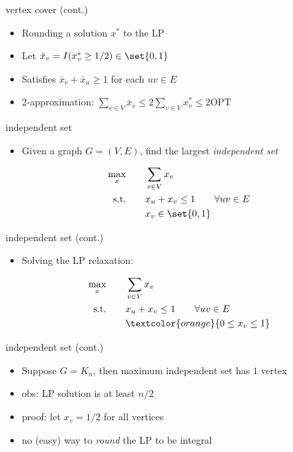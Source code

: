 \documentclass[aspectratio=169, handout]{beamer}
\begin{document}
\begin{frame}{vertex cover (cont.)}
    \begin{itemize}[<+->]
        \item Rounding a solution $x^*$ to the LP
        \item Let $\bar{x}_v = I(x^*_v \ge 1/2) \in \set{0, 1}$
        \item Satisfies $\bar{x}_v + \bar{x}_u \ge 1$ for each $uv \in E$
        \item 2-approximation: $\sum_{v \in V} \bar{x}_v \le 2 \sum_{v \in V} x^*_v \le 2 \text{OPT}$
    \end{itemize}
\end{frame}

\begin{frame}{independent set}
    \begin{itemize}
        \item Given a graph $G = (V, E)$, find the largest \emph{independent set}
    \end{itemize}

    \pause

    \begin{align*}
        \max_{x} \qquad    & \sum_{v \in V} x_v                      \\
        \text{s.t.} \qquad & x_u + x_v \le 1 \qquad \forall uv \in E \\
                           & x_v \in \set{0, 1}
    \end{align*}
\end{frame}

\begin{frame}{independent set (cont.)}
    \begin{itemize}
        \item Solving the LP relaxation:
    \end{itemize}

    \begin{align*}
        \max_{x} \qquad    & \sum_{v \in V} x_v                      \\
        \text{s.t.} \qquad & x_u + x_v \le 1 \qquad \forall uv \in E \\
                           & \textcolor{orange}{0 \le x_v \le 1}
    \end{align*}
\end{frame}

\begin{frame}{independent set (cont.)}
    \begin{itemize}[<+->]
        \item Suppose $G = K_n$, then maximum independent set has $1$ vertex
        \item obs: LP solution is at least $n/2$
        \item proof: let $x_v = 1/2$ for all vertices
        \item no (easy) way to \emph{round} the LP to be integral
    \end{itemize}
\end{frame}
\end{document}
